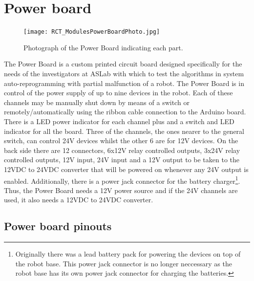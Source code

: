 
\section{Power board}
\label{sec:devmanual_power}

\begin{figure}[htbp]
\begin{center}
 {\texttt{[image: RCT\_ModulesPowerBoardPhoto.jpg]}}
\end{center}
\caption{Photograph of the Power Board indicating each part.}
\label{fig:ModulesPowerBoardPhoto}
\end{figure}
The Power Board is a custom printed circuit board designed specifically for the
needs of the investigators at ASLab with which to test the algorithms in system
auto-reprogramming with partial malfunction of a robot.
The Power Board is in control of the power supply of up to nine devices in the robot. Each
of these channels may be manually shut down by means of a switch or
remotely/automatically using the ribbon cable connection to the Arduino board.
There is a LED power indicator for each channel plus and a switch and LED
indicator for all the board.
Three of the channels, the ones nearer to the general switch, can control 24V
devices whilst the other 6 are for 12V devices. On the back side there are 12
connectors, 6x12V relay controlled outputs, 3x24V relay controlled outputs, 12V
input, 24V input and a 12V output to be taken to the 12VDC to 24VDC converter
that will be powered on whenever any 24V output is enabled. Additionally, there
is a power jack connector for the battery charger\footnote{Originally there was a lead battery pack
for powering the devices on top of the robot base. This power jack connector is no longer neccessary as
the robot base has its own power jack connector for charging the batteries.}.
Thus, the Power Board needs a 12V power source and if the 24V channels are used,
it also needs a 12VDC to 24VDC converter.

\subsection{Power board pinouts}

